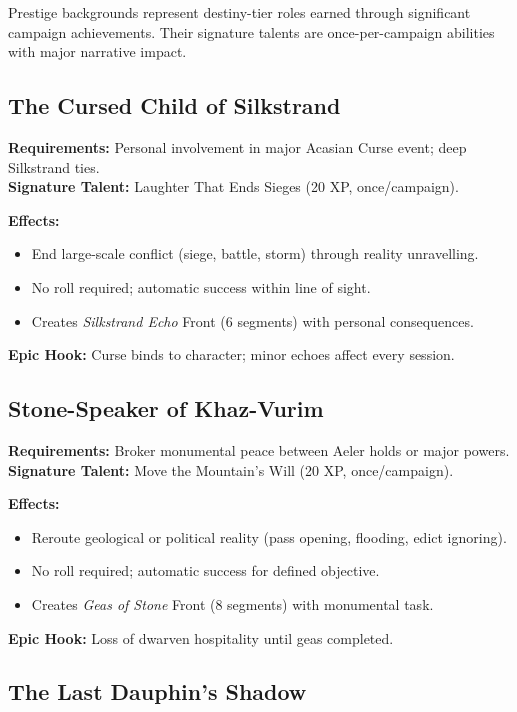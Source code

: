 Prestige backgrounds represent destiny-tier roles earned through significant campaign achievements. Their signature talents are once-per-campaign abilities with major narrative impact.

\subsection{The Cursed Child of Silkstrand}\label{subsec:cursed_child}

\textbf{Requirements:} Personal involvement in major Acasian Curse event; deep Silkstrand ties.\\
\textbf{Signature Talent:} Laughter That Ends Sieges (20 XP, once/campaign).

\textbf{Effects:}
\begin{itemize}
    \item End large-scale conflict (siege, battle, storm) through reality unravelling.
    \item No roll required; automatic success within line of sight.
    \item Creates \emph{Silkstrand Echo} Front (6 segments) with personal consequences.
\end{itemize}
\textbf{Epic Hook:} Curse binds to character; minor echoes affect every session.

\subsection{Stone-Speaker of Khaz-Vurim}\label{subsec:stone_speaker}

\textbf{Requirements:} Broker monumental peace between Aeler holds or major powers.\\
\textbf{Signature Talent:} Move the Mountain's Will (20 XP, once/campaign).

\textbf{Effects:}
\begin{itemize}
    \item Reroute geological or political reality (pass opening, flooding, edict ignoring).
    \item No roll required; automatic success for defined objective.
    \item Creates \emph{Geas of Stone} Front (8 segments) with monumental task.
\end{itemize}
\textbf{Epic Hook:} Loss of dwarven hospitality until geas completed.

\subsection{The Last Dauphin's Shadow}\label{subsec:dauphin_shadow}

